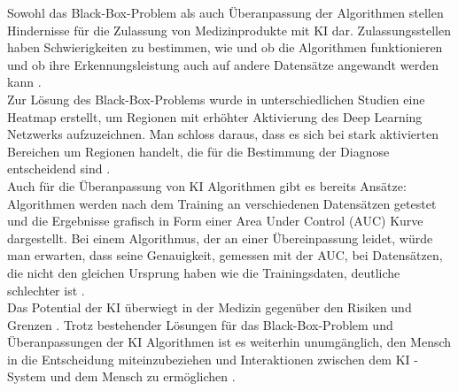Sowohl das Black-Box-Problem als auch Überanpassung der Algorithmen stellen Hindernisse für die Zulassung von Medizinprodukte mit KI dar. Zulassungsstellen haben Schwierigkeiten zu bestimmen, wie und ob die Algorithmen funktionieren und ob ihre Erkennungsleistung auch auf andere Datensätze angewandt werden kann \cite{AI_where_are_we_now}.\\
Zur Lösung des Black-Box-Problems wurde in unterschiedlichen Studien eine Heatmap erstellt, um Regionen mit erhöhter Aktivierung des Deep Learning Netzwerks aufzuzeichnen. Man schloss daraus, dass es sich bei stark aktivierten Bereichen um Regionen handelt, die für die Bestimmung der Diagnose entscheidend sind \cite{AI_where_are_we_now}.\\
Auch für die Überanpassung von KI Algorithmen gibt es bereits Ansätze: Algorithmen werden nach dem Training an verschiedenen Datensätzen getestet\cite{AI_where_are_we_now} und die Ergebnisse grafisch in Form einer Area Under Control (AUC)  Kurve dargestellt. Bei einem Algorithmus, der an einer Übereinpassung leidet, würde man erwarten, dass seine Genauigkeit, gemessen mit der AUC, bei Datensätzen, die nicht den gleichen Ursprung haben wie die Trainingsdaten, deutliche schlechter ist \cite{AI_where_are_we_now}.\\

Das Potential der KI überwiegt in der Medizin  gegenüber den Risiken und Grenzen  \cite{Chapter_14}. Trotz bestehender Lösungen für das Black-Box-Problem und Überanpassungen der KI Algorithmen ist es weiterhin unumgänglich, den Mensch in die Entscheidung miteinzubeziehen und Interaktionen zwischen dem KI - System und dem Mensch zu ermöglichen
\cite{AI_where_are_we_now}.
